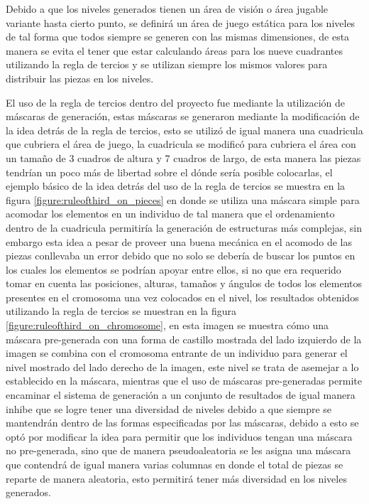 Debido a que los niveles generados tienen un área de visión o área jugable
variante hasta cierto punto, se definirá un área de juego estática para los
niveles de tal forma que todos siempre se generen con las mismas dimensiones, de
esta manera se evita el tener que estar calculando áreas para los nueve
cuadrantes utilizando la regla de tercios y se utilizan siempre los mismos
valores para distribuir las piezas en los niveles.

El uso de la regla de tercios dentro
del proyecto fue mediante la utilización de máscaras de generación, estas máscaras se
generaron mediante la modificación de la idea detrás de la regla de tercios,
esto se utilizó de igual manera una cuadricula que cubriera el área de juego, la
cuadricula se modificó para cubriera el área con un tamaño de 3 cuadros de
altura y 7 cuadros de largo, de esta manera las piezas tendrían un poco más de
libertad sobre el dónde sería posible colocarlas, el ejemplo básico de la idea
detrás del uso de la regla de tercios se muestra en la figura
\ref{figure:ruleofthird_on_pieces} en donde se utiliza una máscara simple para
acomodar los elementos en un individuo de tal manera que el ordenamiento dentro
de la cuadricula permitiría la generación de estructuras más complejas, sin
embargo esta idea a pesar de proveer una buena mecánica en el acomodo de las
piezas conllevaba un error debido que no solo se debería de buscar los puntos en
los cuales los elementos se podrían apoyar entre ellos, si no que era requerido
tomar en cuenta las posiciones, alturas, tamaños y ángulos de todos los
elementos presentes en el cromosoma una vez colocados en el nivel, los
resultados obtenidos utilizando la regla de tercios se muestran en la figura
\ref{figure:ruleofthird_on_chromosome}, en esta imagen se muestra cómo una
máscara pre-generada con una forma de castillo mostrada del lado izquierdo de la
imagen se combina con el cromosoma entrante de un individuo para generar el
nivel mostrado del lado derecho de la imagen, este nivel se trata de asemejar a
lo establecido en la máscara, mientras que el uso de máscaras pre-generadas
permite encaminar el sistema de generación a un conjunto de resultados de igual
manera inhibe que se logre tener una diversidad de niveles debido a que siempre
se mantendrán dentro de las formas especificadas por las máscaras, debido a esto
se optó por modificar la idea para permitir que los individuos tengan una
máscara no pre-generada, sino que de manera pseudoaleatoria se les asigna una
máscara que contendrá de igual manera varias columnas en donde el total de
piezas se reparte de manera aleatoria, esto permitirá tener más diversidad en
los niveles generados.

